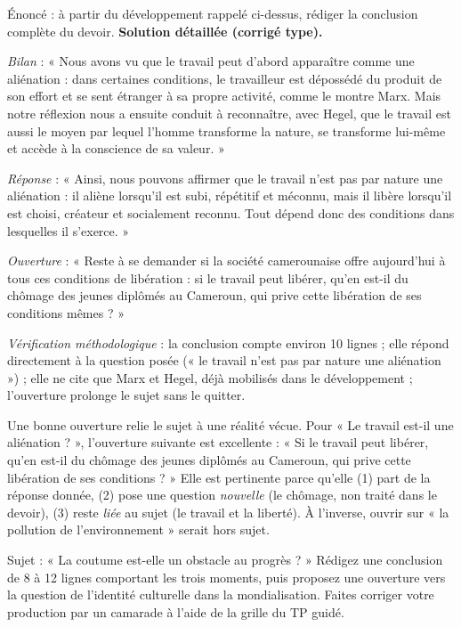 \documentclass[11pt]{article}
\begin{document}
\begin{exoresolu}
Énoncé : à partir du développement rappelé ci-dessus, rédiger la conclusion complète du devoir.
\tcblower
\textbf{Solution détaillée (corrigé type).}

\emph{Bilan} : « Nous avons vu que le travail peut d'abord apparaître comme une aliénation : dans certaines conditions, le travailleur est dépossédé du produit de son effort et se sent étranger à sa propre activité, comme le montre Marx. Mais notre réflexion nous a ensuite conduit à reconnaître, avec Hegel, que le travail est aussi le moyen par lequel l'homme transforme la nature, se transforme lui-même et accède à la conscience de sa valeur. »

\emph{Réponse} : « Ainsi, nous pouvons affirmer que le travail n'est pas par nature une aliénation : il aliène lorsqu'il est subi, répétitif et méconnu, mais il libère lorsqu'il est choisi, créateur et socialement reconnu. Tout dépend donc des conditions dans lesquelles il s'exerce. »

\emph{Ouverture} : « Reste à se demander si la société camerounaise offre aujourd'hui à tous ces conditions de libération : si le travail peut libérer, qu'en est-il du chômage des jeunes diplômés au Cameroun, qui prive cette libération de ses conditions mêmes ? »

\emph{Vérification méthodologique} : la conclusion compte environ 10 lignes ; elle répond directement à la question posée (« le travail n'est pas par nature une aliénation ») ; elle ne cite que Marx et Hegel, déjà mobilisés dans le développement ; l'ouverture prolonge le sujet sans le quitter.
\end{exoresolu}

\begin{exemplebox}
Une bonne ouverture relie le sujet à une réalité vécue. Pour « Le travail est-il une aliénation ? », l'ouverture suivante est excellente : « Si le travail peut libérer, qu'en est-il du chômage des jeunes diplômés au Cameroun, qui prive cette libération de ses conditions ? » Elle est pertinente parce qu'elle (1) part de la réponse donnée, (2) pose une question \emph{nouvelle} (le chômage, non traité dans le devoir), (3) reste \emph{liée} au sujet (le travail et la liberté). À l'inverse, ouvrir sur « la pollution de l'environnement » serait hors sujet.
\end{exemplebox}

\begin{exercice}
Sujet : « La coutume est-elle un obstacle au progrès ? » Rédigez une conclusion de 8 à 12 lignes comportant les trois moments, puis proposez une ouverture vers la question de l'identité culturelle dans la mondialisation. Faites corriger votre production par un camarade à l'aide de la grille du TP guidé.
\end{exercice}
\end{document}

